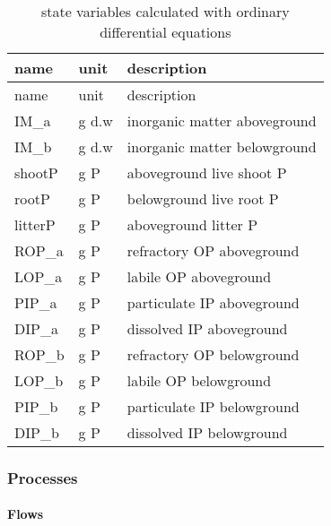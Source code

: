 \documentclass[
]{article}
\begin{document}
\begin{longtable}[]{@{}lll@{}}
\caption{state variables calculated with ordinary differential
equations}\tabularnewline
\toprule\noalign{}
name & unit & description \\
\midrule\noalign{}
\endfirsthead
\toprule\noalign{}
name & unit & description \\
\midrule\noalign{}
\endhead
\bottomrule\noalign{}
\endlastfoot
IM\_a & g d.w & inorganic matter aboveground \\
IM\_b & g d.w & inorganic matter belowground \\
shootP & g P & aboveground live shoot P \\
rootP & g P & belowground live root P \\
litterP & g P & aboveground litter P \\
ROP\_a & g P & refractory OP aboveground \\
LOP\_a & g P & labile OP aboveground \\
PIP\_a & g P & particulate IP aboveground \\
DIP\_a & g P & dissolved IP aboveground \\
ROP\_b & g P & refractory OP belowground \\
LOP\_b & g P & labile OP belowground \\
PIP\_b & g P & particulate IP belowground \\
DIP\_b & g P & dissolved IP belowground \\
\end{longtable}

\hypertarget{processes}{%
\subsubsection{Processes}\label{processes}}

\hypertarget{flows}{%
\paragraph{Flows}\label{flows}}
\end{document}
